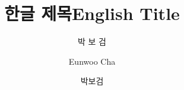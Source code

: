 \documentclass[master, korean]{pnuthesis}
\title[korean]{한글 제목}
\title[english]{English Title}
\author[korean]{박 보 검}
\author[english]{Eunwoo Cha}
\author[nospace]{박보검}
\begin{document}
\renewcommand{\baselinestretch}{1.5}    %
\selectfont                             %

\changepage{5mm}{}{}{}{}{}{}{}{-5mm}    %
\makelists   %



%
%

\begin{thebibliography}{00}
\end{thebibliography}

\appendix %

\pagebreak
\acknowledgement %
\end{document}
